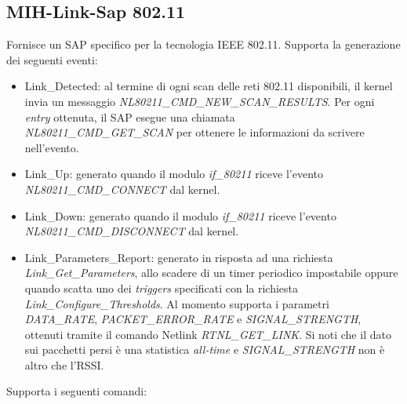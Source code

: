 \subsection{MIH-Link-Sap 802.11}
Fornisce un SAP specifico per la tecnologia IEEE 802.11. Supporta la generazione dei seguenti eventi:
\begin{itemize}
\item Link\_Detected: al termine di ogni scan delle reti 802.11 disponibili, il kernel invia un messaggio  {\em NL80211\_CMD\_NEW\_SCAN\_RESULTS}. Per ogni {\em entry} ottenuta, il SAP esegue una chiamata \\{\em NL80211\_CMD\_GET\_SCAN} per ottenere le informazioni da scrivere nell'evento.
\item Link\_Up: generato quando il modulo {\em if\_80211} riceve l'evento \\{\em NL80211\_CMD\_CONNECT} dal kernel.
\item Link\_Down: generato quando il modulo {\em if\_80211} riceve l'evento \\{\em NL80211\_CMD\_DISCONNECT} dal kernel.
\item Link\_Parameters\_Report: generato in risposta ad una richiesta \\{\em Link\_Get\_Parameters}, allo scadere di un timer periodico impostabile oppure quando scatta uno dei {\em triggers} specificati con la richiesta {\em Link\_Configure\_Thresholds}. Al momento supporta i parametri \\{\em DATA\_RATE}, {\em PACKET\_ERROR\_RATE} e {\em SIGNAL\_STRENGTH}, ottenuti tramite il comando Netlink {\em RTNL\_GET\_LINK}. Si noti che il dato sui pacchetti persi è una statistica {\em all-time} e {\em SIGNAL\_STRENGTH} non è altro che l'RSSI.
\end{itemize}
Supporta i seguenti comandi:
